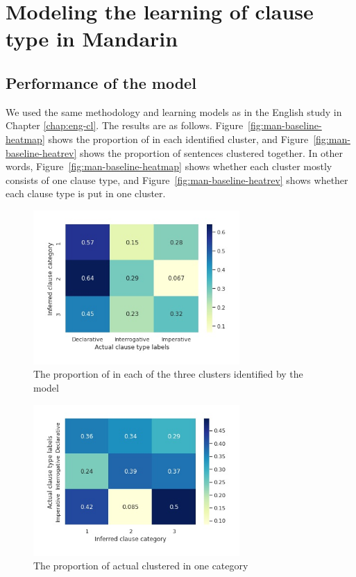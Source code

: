 \section{Modeling the learning of clause type in 
Mandarin}
\label{sec:mancl:model}


\subsection{Performance of the \dlearnerabbr{} model}
\label{sec:mancl:model:results:d}

We used the same methodology and learning models as in the English study in Chapter \ref{chap:eng-cl}. The results are as follows.
Figure~\ref{fig:man-baseline-heatmap} shows the proportion of \diis{} in each identified cluster, and Figure~\ref{fig:man-baseline-heatrev} shows the proportion of sentences clustered together. In other words, Figure~\ref{fig:man-baseline-heatmap} shows whether each cluster mostly consists of one clause type, and Figure~\ref{fig:man-baseline-heatrev} shows whether each clause type is put in one cluster.  



\begin{figure}[H]
    \centering
    \includegraphics[width=0.7\textwidth]{figures/man-baseline-conservative-heat.jpg}
    \caption{The proportion of \diis{} in each of the three clusters identified by the \dlearnerabbr{} model}
    \label{fig:man-baseline-conservative-heat}
\end{figure}


\begin{figure}[H]
    \centering
    \includegraphics[width=0.7\textwidth]{figures/man-baseline-conservative-heatrev.jpg}
    \caption{The proportion of actual \diis{} clustered in one category}
    \label{fig:man-baseline-conservative-heatrev}
\end{figure}

